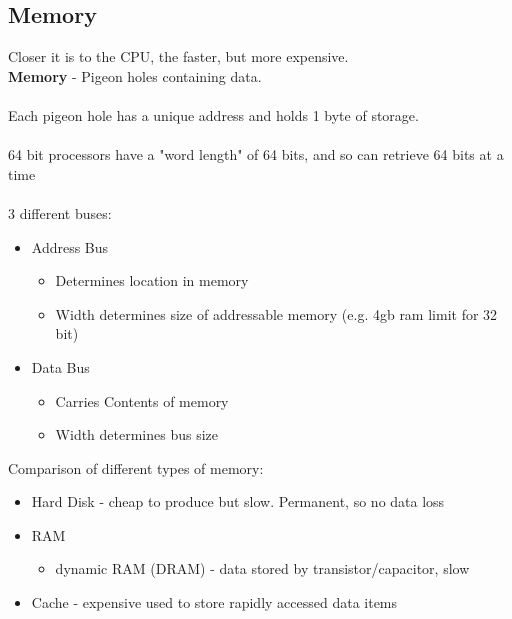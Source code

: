 \documentclass{article}[18pt]
\begin{document}
\subsection{Memory}
Closer it is to the CPU, the faster, but more expensive.\\
\textbf{Memory} - Pigeon holes containing data.\\
\\
Each pigeon hole has a unique address and holds 1 byte of storage.\\
\\
64 bit processors have a "word length" of 64 bits, and so can retrieve 64 bits at a time\\
\\
3 different buses:
\begin{itemize}
\item Address Bus\begin{itemize}
\item Determines location in memory
\item Width determines size of addressable memory (e.g. 4gb ram limit for 32 bit) 
\end{itemize}
\item Data Bus\begin{itemize}
\item Carries Contents of memory
\item Width determines bus size 
\end{itemize}
\end{itemize}
Comparison of different types of memory:
\begin{itemize}
\item Hard Disk - cheap to produce but slow. Permanent, so no data loss
\item RAM \begin{itemize}
\item dynamic RAM (DRAM) - data stored by transistor/capacitor, slow 
\end{itemize}
\item Cache - expensive used to store rapidly accessed data items

\end{itemize}
\end{document}
